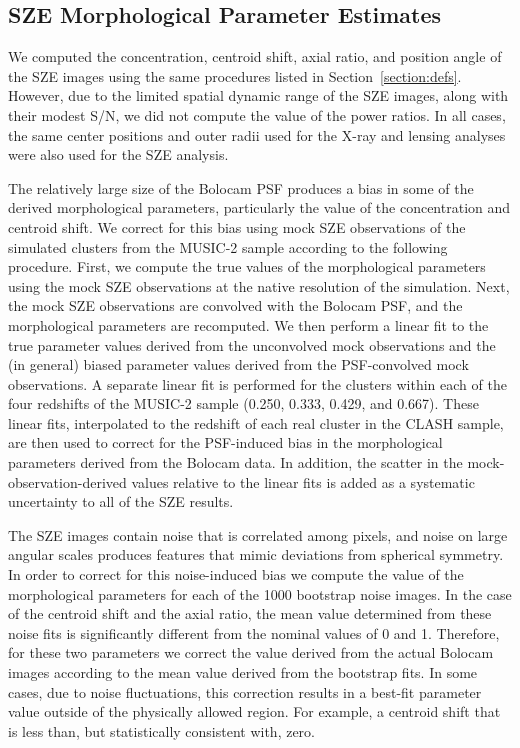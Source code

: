 \documentclass[iop,twocolumn]{emulateapj}
\begin{document}
{\subsection{SZE Morphological Parameter Estimates \label{section:SZEmorph}}


We computed the concentration, centroid shift, axial ratio, and position angle of the 
SZE images using the same procedures listed in Section~\ref{section:defs}. However, due to the limited
spatial dynamic range of the SZE images, along with their modest S/N, we did not
compute the value of the power ratios. In all cases, the same center positions and 
outer radii used for the X-ray and lensing analyses were also used for the SZE
analysis.

The relatively large size of the Bolocam PSF produces a bias in some of the derived morphological
parameters, particularly the value of the concentration and centroid shift.
We correct for this bias using mock SZE observations of the simulated clusters
from the MUSIC-2 sample according to the following procedure.
First, we compute the true values of the morphological parameters using the
mock SZE observations at the native resolution of the simulation.
Next, the mock SZE observations are convolved with the Bolocam PSF, and the
morphological parameters are recomputed.
We then perform a linear fit to the true parameter values derived from the 
unconvolved mock observations and the (in general) biased parameter values
derived from the PSF-convolved mock observations.
A separate linear fit is performed for the clusters within each of the four
redshifts of the MUSIC-2 sample (0.250, 0.333, 0.429, and 0.667).
These linear fits, interpolated to the redshift of each real cluster in the 
CLASH sample, are then used to correct for the PSF-induced bias in the 
morphological parameters derived from the Bolocam data.
In addition, the scatter in the mock-observation-derived values
relative to the linear fits is added as a systematic
uncertainty to all of the SZE results.

The SZE images contain noise that is correlated among pixels, and  
noise on large angular scales produces features that mimic deviations
from spherical symmetry. In order to correct for this noise-induced
bias we compute the value of the morphological parameters for each
of the 1000 bootstrap noise images. In the case of the centroid shift
and the axial ratio, the mean value determined from these noise fits
is significantly different from the nominal values of 0 and 1. 
Therefore, for these two parameters we correct the value derived
from the actual Bolocam images according to the mean value
derived from the bootstrap fits. In some cases, due to noise fluctuations,
this correction results in a best-fit parameter value outside
of the physically allowed region. For example, a centroid shift that 
is less than, but statistically consistent with, zero.

}
\end{document}
